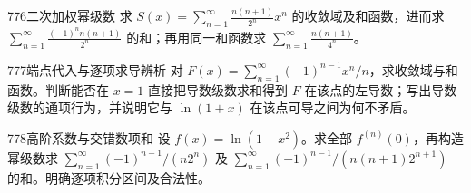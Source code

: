 \begin{exercise}{776}{二次加权幂级数}
求 $S(x)=\sum_{n=1}^{\infty}\frac{n(n+1)}{2^n}x^n$ 的收敛域及和函数，进而求 $\sum_{n=1}^{\infty}\frac{(-1)^n n(n+1)}{2^n}$ 的和；再用同一和函数求 $\sum_{n=1}^{\infty}\frac{n(n+1)}{4^n}$。
\end{exercise}
\begin{exercise}{777}{端点代入与逐项求导辨析}
对 $F(x)=\sum_{n=1}^{\infty}(-1)^{n-1}x^n/n$，求收敛域与和函数。判断能否在 $x=1$ 直接把导数级数求和得到 $F$ 在该点的左导数；写出导数级数的通项行为，并说明它与 $\ln(1+x)$ 在该点可导之间为何不矛盾。
\end{exercise}
\begin{exercise}{778}{高阶系数与交错数项和}
设 $f(x)=\ln(1+x^2)$。求全部 $f^{(n)}(0)$，再构造幂级数求 $\sum_{n=1}^{\infty}(-1)^{n-1}/(n2^n)$ 及 $\sum_{n=1}^{\infty}(-1)^{n-1}/(n(n+1)2^{n+1})$ 的和。明确逐项积分区间及合法性。
\end{exercise}
